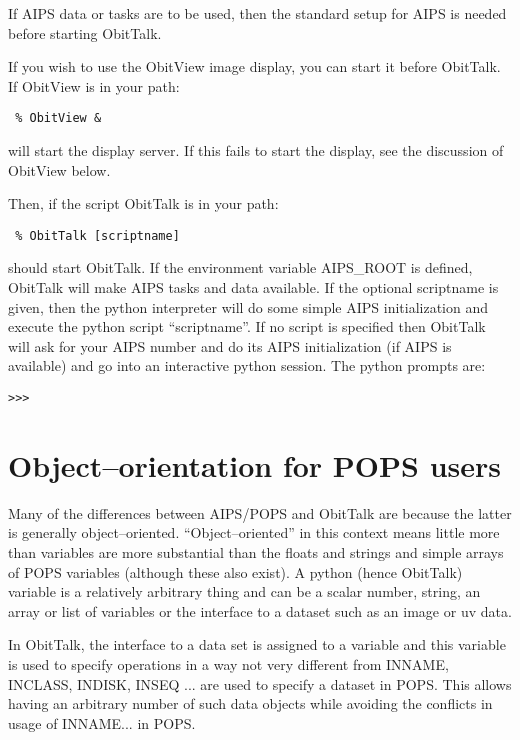 \documentclass[11pt]{report}
\begin{document}
If AIPS data or tasks are to be used, then the standard setup for AIPS
is needed before starting ObitTalk.

If you wish to use the ObitView image display, you can start it before
ObitTalk.
If ObitView is in your path:
\begin{verbatim}
 % ObitView &
\end{verbatim}
will start the display server.
If this fails to start the display, see the discussion of ObitView below.

Then, if the script ObitTalk is in your path:
\begin{verbatim}
 % ObitTalk [scriptname]
\end{verbatim}
should start ObitTalk.
If the environment variable AIPS\_ROOT is defined, ObitTalk will
make AIPS tasks and data available.
If the optional scriptname is given, then the python interpreter will
do some simple AIPS initialization and execute the python script
``scriptname''. 
If no script is specified then ObitTalk will ask for your AIPS number
and do its AIPS initialization (if AIPS is available) and go into an
interactive python session.
The python prompts are: \begin{verbatim}>>> \end{verbatim}

\section {Object--orientation for POPS users}
Many of the differences between AIPS/POPS and ObitTalk are because the
latter is generally object--oriented.
``Object--oriented'' in this context means little more than variables
are more substantial than the floats and strings and simple arrays of
POPS variables (although these also exist).
A python (hence ObitTalk) variable is a relatively arbitrary thing and
can be a scalar number, string, an array or list of variables or the
interface to a dataset such as an image or uv data.

In ObitTalk, the interface to a  data set is assigned to a variable and
this variable is used to specify operations in a way not very
different from INNAME, INCLASS, INDISK, INSEQ ... are used to specify
a dataset in POPS.
This allows having an arbitrary number of such data objects while
avoiding the conflicts in usage of INNAME... in POPS.
\end{document}
